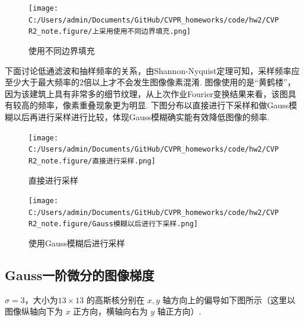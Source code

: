 \documentclass[12pt, a4paper, oneside]{ctexart}
\numberwithin{equation}{section}  %
\begin{document}
\begin{figure}[htbp]
    \centering
    \hspace*{-1cm}
    \texttt{[image: C:/Users/admin/Documents/GitHub/CVPR\_homeworks/code/hw2/CVPR2\_note.figure/上采用使用不同边界填充.png]}
    \caption{使用不同边界填充\label{fig-3}}
\end{figure}

\begin{figure}[htbp]
    \centering
\end{figure}

下面讨论低通滤波和抽样频率的关系，由Shannon-Nyquist定理可知，采样频率应至少大于最大频率的2倍以上才不会发生图像像素混淆.
图像使用的是“黄鹤楼”，因为该建筑上具有非常多的细节纹理，从上次作业Fourier变换结果来看，该图具有较高的频率，像素重叠现象更为明显.
下图分布以直接进行下采样和做Gauss模糊以后再进行采样进行比较，体现Gauss模糊确实能有效降低图像的频率.

\begin{figure}[htbp]
    \centering
    \hspace*{-1.5cm}
    \texttt{[image: C:/Users/admin/Documents/GitHub/CVPR\_homeworks/code/hw2/CVPR2\_note.figure/直接进行采样.png]}
    \caption{直接进行采样\label{fig-4}}
\end{figure}

\begin{figure}[htbp]
    \centering
    \hspace*{-1.5cm}
    \texttt{[image: C:/Users/admin/Documents/GitHub/CVPR\_homeworks/code/hw2/CVPR2\_note.figure/Gauss模糊以后进行下采样.png]}
    \caption{使用Gauss模糊后进行采样\label{fig-5}}
\end{figure}

\clearpage
\subsection{Gauss一阶微分的图像梯度}
\(\sigma = 3\)，大小为\(13\times 13\) 的高斯核分别在 \(x,y\)
轴方向上的偏导如下图所示（这里以图像纵轴向下为 \(x\) 正方向，横轴向右为
\(y\) 轴正方向）.
\end{document}
